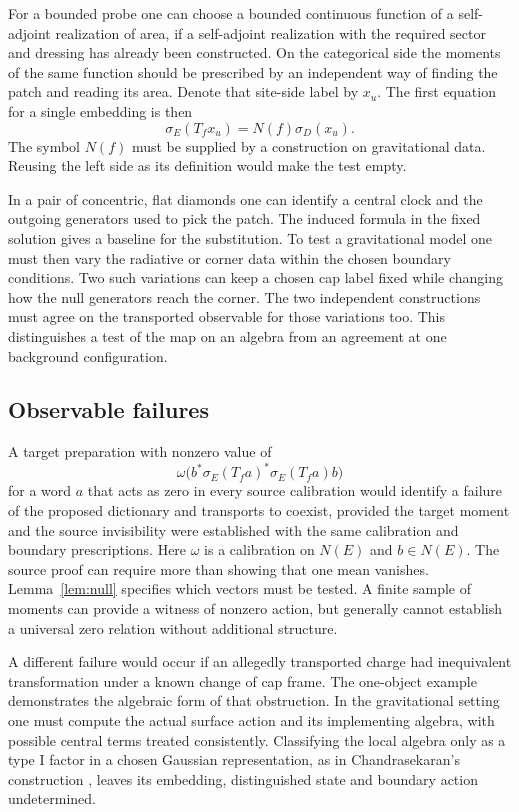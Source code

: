 \documentclass[11pt,letterpaper]{article}
\begin{document}
For a bounded probe one can choose a bounded continuous function of a self-adjoint realization of area, if a self-adjoint realization with the required sector and dressing has already been constructed. On the categorical side the moments of the same function should be prescribed by an independent way of finding the patch and reading its area. Denote that site-side label by $x_u$. The first equation for a single embedding is then
\[
    \sigma_E(T_fx_u)=N(f)\sigma_D(x_u).
\]
The symbol $N(f)$ must be supplied by a construction on gravitational data. Reusing the left side as its definition would make the test empty.

In a pair of concentric, flat diamonds one can identify a central clock and the outgoing generators used to pick the patch. The induced formula in the fixed solution gives a baseline for the substitution. To test a gravitational model one must then vary the radiative or corner data within the chosen boundary conditions. Two such variations can keep a chosen cap label fixed while changing how the null generators reach the corner. The two independent constructions must agree on the transported observable for those variations too. This distinguishes a test of the map on an algebra from an agreement at one background configuration.

\subsection{Observable failures}

A target preparation with nonzero value of
\[
 \omega\big(b^*\sigma_E(T_fa)^*\sigma_E(T_fa)b\big)
\]
for a word $a$ that acts as zero in every source calibration would identify a failure of the proposed dictionary and transports to coexist, provided the target moment and the source invisibility were established with the same calibration and boundary prescriptions. Here $\omega$ is a calibration on $N(E)$ and $b\in N(E)$. The source proof can require more than showing that one mean vanishes. Lemma~\ref{lem:null} specifies which vectors must be tested. A finite sample of moments can provide a witness of nonzero action, but generally cannot establish a universal zero relation without additional structure.

A different failure would occur if an allegedly transported charge had inequivalent transformation under a known change of cap frame. The one-object example demonstrates the algebraic form of that obstruction. In the gravitational setting one must compute the actual surface action and its implementing algebra, with possible central terms treated consistently. Classifying the local algebra only as a type I factor in a chosen Gaussian representation, as in Chandrasekaran's construction \cite[Secs.~4--5]{nc}, leaves its embedding, distinguished state and boundary action undetermined.
\end{document}
